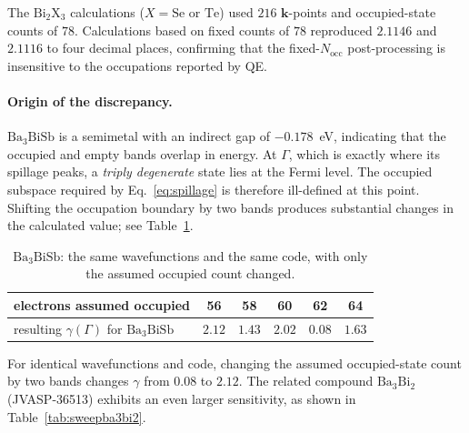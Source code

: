 \documentclass[11pt]{article}
\newcommand{\Nocc}{N_{\mathrm{occ}}}
\newcommand{\kk}{\mathbf{k}}
\newcommand{\bath}{\mathrm{Ba_3BiSb}}
\begin{document}
The $\mathrm{Bi_2X_3}$ calculations ($X=\mathrm{Se}$ or $\mathrm{Te}$) used $216$ $\kk$-points and
occupied-state counts of $78$. Calculations based on fixed counts of $78$ reproduced $2.1146$ and
$2.1116$ to four decimal places, confirming
that the fixed-$\Nocc$ post-processing is insensitive to the occupations reported by QE.

\paragraph{Origin of the discrepancy.} $\bath$ is a semimetal with an indirect gap of
$-0.178$~eV, indicating that the
occupied and empty bands overlap in energy. At $\Gamma$, which is exactly where its spillage peaks,
a \emph{triply degenerate} state lies at the Fermi level. The occupied subspace required by
Eq.~\eqref{eq:spillage} is therefore ill-defined at this point. Shifting the occupation boundary by
two bands produces substantial changes in the calculated value; see Table~\ref{tab:sweepbath}.

\begin{table}[htbp]
\centering
\caption{$\bath$: the same wavefunctions and the same code, with only the assumed occupied count
changed.}\label{tab:sweepbath}
\begin{tabular}{@{}lccccc@{}}
\toprule
electrons assumed occupied & 56 & 58 & \textbf{60} & 62 & 64 \\
\midrule
resulting $\gamma(\Gamma)$ for $\bath$ & $2.12$ & $1.43$ & $\mathbf{2.02}$ & $0.08$ & $1.63$ \\
\bottomrule
\end{tabular}
\end{table}

\noindent For identical wavefunctions and code, changing the assumed occupied-state count by two
bands changes $\gamma$ from $0.08$ to $2.12$. The related compound $\mathrm{Ba_3Bi_2}$
(JVASP-36513) exhibits an even larger sensitivity, as shown in
Table~\ref{tab:sweepba3bi2}.
\end{document}
